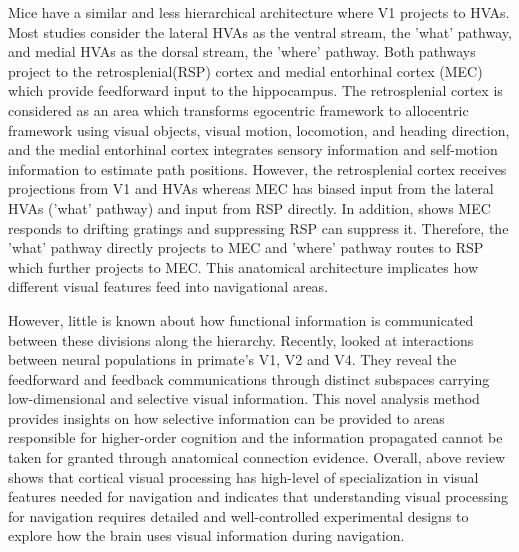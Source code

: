 Mice have a similar and less hierarchical architecture where V1 projects to HVAs. Most studies consider the lateral HVAs as the ventral stream, the 'what' pathway, and medial HVAs as the dorsal stream, the 'where' pathway. Both pathways project to the retrosplenial(RSP) cortex and medial entorhinal cortex (MEC) which provide feedforward input to the hippocampus. The retrosplenial cortex is considered as an area which transforms egocentric framework to allocentric framework using visual objects, visual motion, locomotion, and heading direction, and the medial entorhinal cortex  integrates sensory information and self-motion information to estimate path positions. However, the retrosplenial cortex receives projections from V1 and HVAs whereas MEC has biased input from the lateral HVAs ('what' pathway) and input from RSP directly. In addition, \cite{dubanet_retrosplenial_2024} shows MEC responds to drifting gratings and suppressing RSP can suppress it. Therefore, the 'what' pathway directly projects to MEC and 'where' pathway routes to RSP which further projects to MEC. This anatomical architecture implicates how different visual features feed into navigational areas. 

However, little is known about how functional information is communicated between these divisions along the hierarchy. Recently, \cite{semedo_cortical_2019} looked at interactions between neural populations in primate's V1, V2 and V4. They reveal the feedforward and feedback communications through distinct subspaces carrying low-dimensional and selective visual information. This novel analysis method provides insights on how selective information can be provided to areas responsible for higher-order cognition and the information propagated cannot be taken for granted through anatomical connection evidence. Overall, above review shows that cortical visual processing has high-level of specialization in visual features needed for navigation and indicates that understanding visual processing for navigation requires detailed and well-controlled experimental designs to explore how the brain uses visual information during navigation.



